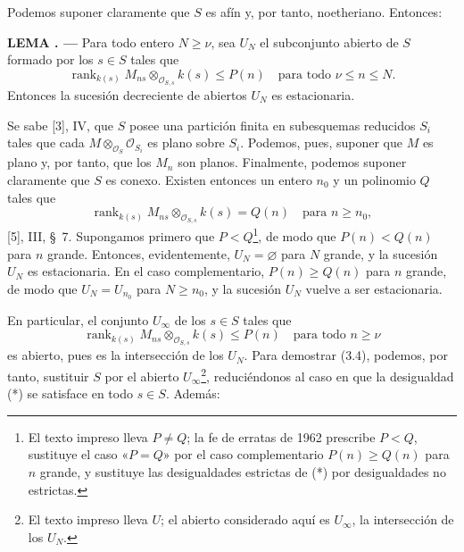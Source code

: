 \documentclass[11pt,twoside,openany]{book}
\numberwithin{equation}{section}
\theoremstyle{plain}
\theoremstyle{definition}
\theoremstyle{remark}
\newcommand{\result}[2]{%
  \par\medskip\noindent\textbf{#1%
  \if\relax\detokenize{#2}\relax\else\space#2\fi. ---}\enspace
}
\theoremstyle{plain}
\theoremstyle{definition}
\theoremstyle{remark}
\begin{document}
Podemos suponer claramente que $S$ es afín y, por tanto, noetheriano. Entonces:

\result{LEMA}{3.5} Para todo entero $N\geq\nu$, sea $U_N$ el subconjunto
abierto de $S$ formado por los $s\in S$ tales que
\[
\operatorname{rank}_{k(s)}
M_{ns}\otimes_{\mathcal O_{S,s}}k(s)\leq P(n)
\quad\text{para todo $\nu\leq n\leq N$}.
\]
Entonces la sucesión decreciente de abiertos $U_N$ es estacionaria.

Se sabe [3], IV, que $S$ posee una partición finita en subesquemas reducidos
$S_i$ tales que cada $M\otimes_{\mathcal O_S}\mathcal O_{S_i}$ es plano sobre
$S_i$. Podemos, pues, suponer que $M$ es plano y, por tanto, que los $M_n$ son
planos. Finalmente, podemos suponer claramente que $S$ es conexo. Existen
entonces un entero $n_0$ y un polinomio $Q$ tales que
\[
\operatorname{rank}_{k(s)}
M_{ns}\otimes_{\mathcal O_{S,s}}k(s)=Q(n)
\quad\text{para $n\geq n_0$},
\]
[5], III, \S~7. Supongamos primero que $P<Q$\footnote{El texto impreso lleva
$P\neq Q$; la fe de erratas de 1962 prescribe $P<Q$, sustituye el caso «$P=Q$» por
el caso complementario $P(n)\geq Q(n)$ para $n$ grande, y sustituye las
desigualdades estrictas de (*) por desigualdades no estrictas.}, de modo que
$P(n)<Q(n)$ para $n$ grande. Entonces, evidentemente, $U_N=\varnothing$ para
$N$ grande, y la sucesión $U_N$ es estacionaria. En el caso complementario,
$P(n)\geq Q(n)$ para $n$ grande, de modo que $U_N=U_{n_0}$ para $N\geq n_0$,
y la sucesión $U_N$ vuelve a ser estacionaria.

En particular, el conjunto $U_\infty$ de los $s\in S$ tales que
\[
\tag{*}
\operatorname{rank}_{k(s)}
M_{ns}\otimes_{\mathcal O_{S,s}}k(s)\leq P(n)
\quad\text{para todo $n\geq\nu$}
\]
es abierto, pues es la intersección de los $U_N$. Para demostrar (3.4),
podemos, por tanto, sustituir $S$ por el abierto $U_\infty$\footnote{El texto impreso lleva $U$; el abierto considerado aquí es $U_\infty$, la intersección de los $U_N$.}, reduciéndonos al caso en
que la desigualdad (*) se satisface en todo $s\in S$. Además:
\end{document}
